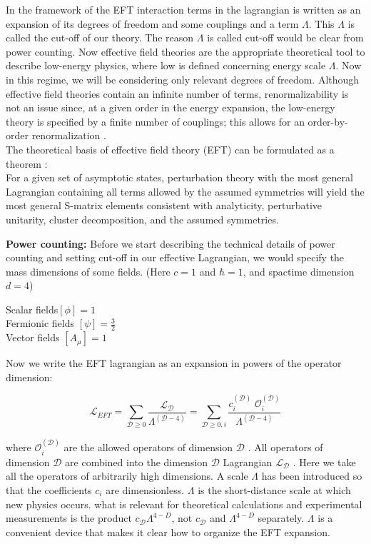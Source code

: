 \documentclass[12pt]{report}
\begin{document}
In the framework of the EFT interaction terms in the lagrangian is written as an expansion of its degrees of freedom and some couplings and a term $\Lambda$. This $\Lambda$ is called the cut-off of our theory. The reason $\Lambda$ is called cut-off would be clear from power counting. Now effective field theories are the appropriate theoretical tool to describe low-energy physics, where low is defined concerning energy scale $\Lambda$. Now in this regime, we will be considering only relevant degrees of freedom. Although effective field theories contain an infinite
number of terms, renormalizability is not an issue since, at a given order in the energy expansion, the low-energy theory is specified by a finite number of couplings; this allows for an order-by-order renormalization \cite{eft1} \cite{eft2}. \\

The theoretical basis of effective field theory (EFT) can be formulated as a theorem \cite{eft2}:\\



For a given set of asymptotic states, perturbation theory with the most general Lagrangian containing all terms allowed by the assumed symmetries will yield the most general S-matrix elements consistent with analyticity, perturbative unitarity, cluster decomposition, and the assumed symmetries.

\textbf{Power counting:} Before we start describing the technical details of power counting and setting cut-off in our effective Lagrangian, we would specify the mass dimensions of some fields.
(Here $c=1$ and $\hbar = 1$, and spactime dimension $d=4$)
\begin{center}
Scalar fields$[\phi]= 1$\\
Fermionic fields $[\psi]= \frac{3}{2}$\\
Vector fields $[A_\mu]=1$\\
\end{center}

Now we write the EFT lagrangian as an expansion in powers of the operator dimension:


$$\mathscr{L}_{EFT}= \sum_{\mathscr{D}\geq 0} \frac{\mathscr{L}_\mathscr{D}}{\Lambda^{(\mathscr{D}-4)}}= \sum_{\mathscr{D}\geq 0 ,i} \frac{c_i^{(\mathscr{D})}\; \mathcal{O}_i^{(\mathscr{D})}}{\Lambda^{(\mathscr{D}-4)}}$$

where $\mathcal{O}_i^{(\mathscr{D})}$ are the allowed operators of dimension $\mathscr{D}$ . All operators of dimension $\mathscr{D}$
are combined into the dimension $\mathscr{D}$ Lagrangian $\mathscr{L}_\mathscr{D}$ . Here we take all the operators of arbitrarily high dimensions.
A scale $\Lambda$ has been introduced so that the coefficients $c_i$ are dimensionless. $\Lambda$ is the short-distance scale at which new physics occurs.
what is relevant for theoretical calculations and experimental measurements is the
product $c_\mathscr{D} \Lambda^{4-D}$, not $c_\mathscr{D}$ and $\Lambda^{4-D}$ separately. $\Lambda$ is a convenient device that makes it clear how to organize the EFT expansion.
\end{document}
